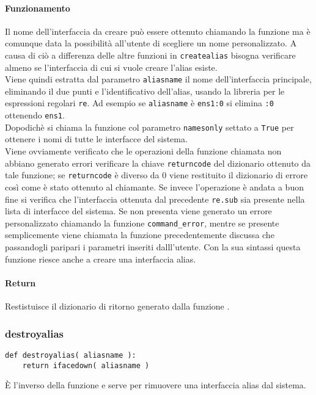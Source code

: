 \documentclass[11pt]{article}
\begin{document}
\paragraph{Funzionamento}
Il nome dell'interfaccia da creare può essere ottenuto chiamando la funzione 
ma è comunque data la possibilità all'utente di scegliere un nome personalizzato. A causa di ciò a differenza
delle altre funzioni in \texttt{createalias} bisogna verificare almeno se l'interfaccia di cui si vuole
creare l'alias esiste.\\
Viene quindi estratta dal parametro \texttt{aliasname} il nome dell'interfaccia principale, eliminando
il due punti e l'identificativo dell'alias, usando la libreria per le espressioni regolari \texttt{re}.
Ad esempio se \texttt{aliasname} è \texttt{ens1:0} si elimina \texttt{:0} ottenendo \texttt{ens1}.\\
Dopodichè si chiama la funzione  col parametro \texttt{namesonly} settato a \texttt{True}
per ottenere i nomi di tutte le interfacce del sistema.\\
Viene ovviamente verificato che le operazioni della funzione chiamata non abbiano generato errori verificare
la chiave \texttt{returncode} del dizionario ottenuto da tale funzione; se \texttt{returncode} è diverso
da 0 viene restituito il dizionario di errore così come è stato ottenuto al chiamante.
Se invece l'operazione è andata a buon fine si verifica che l'interfaccia ottenuta dal precedente \texttt{re.sub}
sia presente nella lista di interfacce del sistema. Se non presenta viene generato un errore personalizzato
chiamando la funzione \texttt{command\_error}, mentre se presente semplicemente viene chiamata la funzione
precedentemente discussa  che passandogli paripari i parametri inseriti dalll'utente.
Con la sua sintassi questa funzione riesce anche a creare una interfaccia alias.
\paragraph{Return}
Restistuisce il dizionario di ritorno generato dalla funzione .

\subsubsection{destroyalias}\label{destroyalias}
\begin{lstlisting}
def destroyalias( aliasname ):
    return ifacedown( aliasname )
\end{lstlisting}
È l'inverso della funzione  e serve per rimuovere una interfaccia alias dal sistema.
\end{document}
